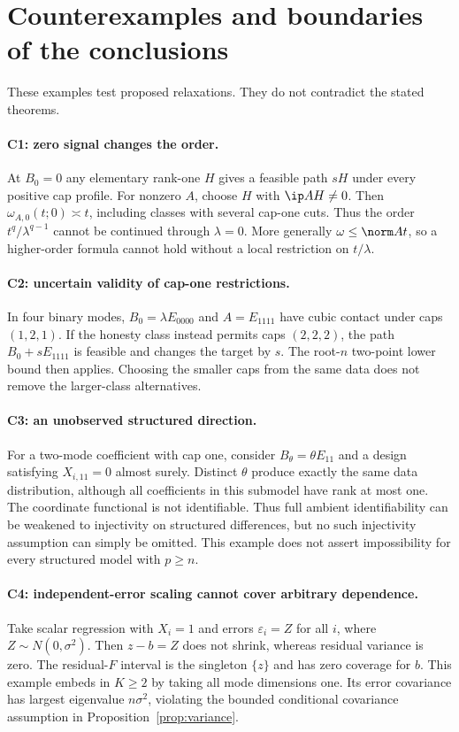 \section{Counterexamples and boundaries of the conclusions}\label{app:counterexamples}
These examples test proposed relaxations. They do not contradict the stated theorems.

\paragraph{C1: zero signal changes the order.}
At $B_0=0$ any elementary rank-one $H$ gives a feasible path $sH$ under every positive cap profile. For nonzero $A$, choose $H$ with $\ip A H\ne0$. Then $\omega_{A,0}(t;0)\asymp t$, including classes with several cap-one cuts. Thus the order $t^q/\lambda^{q-1}$ cannot be continued through $\lambda=0$. More generally $\omega\le\norm A t$, so a higher-order formula cannot hold without a local restriction on $t/\lambda$.

\paragraph{C2: uncertain validity of cap-one restrictions.}
In four binary modes, $B_0=\lambda E_{0000}$ and $A=E_{1111}$ have cubic contact under caps $(1,2,1)$. If the honesty class instead permits caps $(2,2,2)$, the path $B_0+sE_{1111}$ is feasible and changes the target by $s$. The root-$n$ two-point lower bound then applies. Choosing the smaller caps from the same data does not remove the larger-class alternatives.

\paragraph{C3: an unobserved structured direction.}
For a two-mode coefficient with cap one, consider $B_\theta=\theta E_{11}$ and a design satisfying $X_{i,11}=0$ almost surely. Distinct $\theta$ produce exactly the same data distribution, although all coefficients in this submodel have rank at most one. The coordinate functional is not identifiable. Thus full ambient identifiability can be weakened to injectivity on structured differences, but no such injectivity assumption can simply be omitted. This example does not assert impossibility for every structured model with $p\ge n$.

\paragraph{C4: independent-error scaling cannot cover arbitrary dependence.}
Take scalar regression with $X_i=1$ and errors $\varepsilon_i=Z$ for all $i$, where $Z\sim N(0,\sigma^2)$. Then $z-b=Z$ does not shrink, whereas residual variance is zero. The residual-$F$ interval is the singleton $\{z\}$ and has zero coverage for $b$. This example embeds in $K\ge2$ by taking all mode dimensions one. Its error covariance has largest eigenvalue $n\sigma^2$, violating the bounded conditional covariance assumption in Proposition~\ref{prop:variance}.

